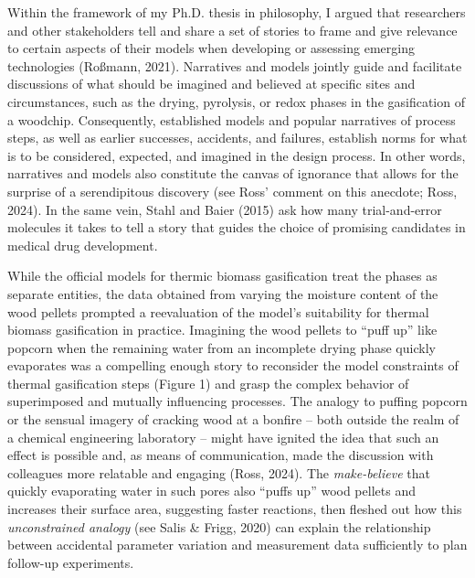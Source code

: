 \documentclass[authordate, anecdote]{jote-new-article}
\begin{document}
	Within the framework of my Ph.D. thesis in philosophy, I argued that researchers and other stakeholders tell and share a set of stories to frame and give relevance to certain aspects of their models when developing or assessing emerging technologies (Roßmann, 2021). Narratives and models jointly guide and facilitate discussions of what should be imagined and believed at specific sites and circumstances, such as the drying, pyrolysis, or redox phases in the gasification of a woodchip. Consequently, established models and popular narratives of process steps, as well as earlier successes, accidents, and failures, establish norms for what is to be considered, expected, and imagined in the design process. In other words, narratives and models also constitute the canvas of ignorance that allows for the surprise of a serendipitous discovery (see Ross' comment on this anecdote; Ross, 2024). In the same vein, Stahl and Baier (2015) ask how many trial-and-error molecules it takes to tell a story that guides the choice of promising candidates in medical drug development.



	While the official models for thermic biomass gasification treat the phases as separate entities, the data obtained from varying the moisture content of the wood pellets prompted a reevaluation of the model's suitability for thermal biomass gasification in practice. Imagining the wood pellets to “puff up” like popcorn when the remaining water from an incomplete drying phase quickly evaporates was a compelling enough story to reconsider the model constraints of thermal gasification steps (Figure 1) and grasp the complex behavior of superimposed and mutually influencing processes. The analogy to puffing popcorn or the sensual imagery of cracking wood at a bonfire -- both outside the realm of a chemical engineering laboratory -- might have ignited the idea that such an effect is possible and, as means of communication, made the discussion with colleagues more relatable and engaging (Ross, 2024). The \emph{make-believe} that quickly evaporating water in such pores also “puffs up” wood pellets and increases their surface area, suggesting faster reactions, then fleshed out how this \emph{unconstrained analogy }(see Salis \& Frigg, 2020) can explain the relationship between accidental parameter variation and measurement data sufficiently to plan follow-up experiments.
\end{document}
